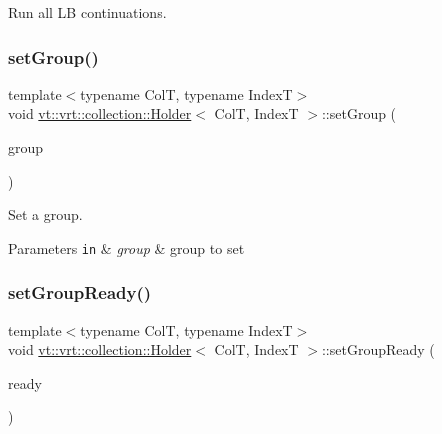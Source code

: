 Run all LB continuations. 

\mbox{\label{structvt_1_1vrt_1_1collection_1_1_holder_ad1004d701690d7de8d323de1d5bc1a29}} 
\subsubsection{\texorpdfstring{set\+Group()}{setGroup()}}
{\footnotesize\ttfamily template$<$typename ColT, typename IndexT$>$ \\
void \hyperlink{structvt_1_1vrt_1_1collection_1_1_holder}{vt\+::vrt\+::collection\+::\+Holder}$<$ ColT, IndexT $>$\+::set\+Group (\begin{DoxyParamCaption}\item[{\hyperlink{namespacevt_a27b5e4411c9b6140c49100e050e2f743}{Group\+Type} const \&}]{group }\end{DoxyParamCaption})\hspace{0.3cm}{\ttfamily [inline]}}



Set a group. 


\begin{DoxyParams}[1]{Parameters}
\mbox{\tt in}  & {\em group} & group to set \\
\hline
\end{DoxyParams}
\mbox{\label{structvt_1_1vrt_1_1collection_1_1_holder_aa666f9e2960605203d325fd39de82dd7}} 
\subsubsection{\texorpdfstring{set\+Group\+Ready()}{setGroupReady()}}
{\footnotesize\ttfamily template$<$typename ColT, typename IndexT$>$ \\
void \hyperlink{structvt_1_1vrt_1_1collection_1_1_holder}{vt\+::vrt\+::collection\+::\+Holder}$<$ ColT, IndexT $>$\+::set\+Group\+Ready (\begin{DoxyParamCaption}\item[{bool const}]{ready }\end{DoxyParamCaption})\hspace{0.3cm}{\ttfamily [inline]}}



